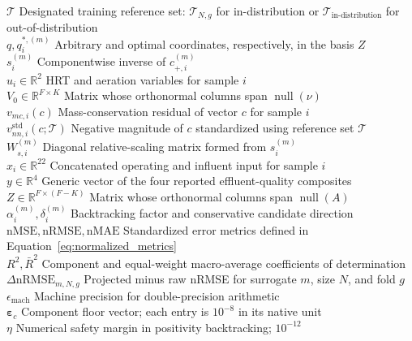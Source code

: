 \documentclass[a4paper,fleqn]{cas-sc}
\newcommand{\csvcomma}{,}
\begin{document}
\begin{tabbing}
$\mathcal{T}$ \> Designated training reference set: $\mathcal{T}_{N\csvcomma{}g}$ for in-distribution or $\mathcal{T}_{\mathrm{in\text{-}distribution}}$ for out-of-distribution \\
$q\csvcomma{}q_i^{*\csvcomma{}(m)}$ \> Arbitrary and optimal coordinates\csvcomma{} respectively\csvcomma{} in the basis $Z$ \\
$s_i^{(m)}$ \> Componentwise inverse of $c_{+\csvcomma{}i}^{(m)}$ \\
$u_i\in\mathbb{R}^{2}$ \> HRT and aeration variables for sample $i$ \\
$V_0\in\mathbb{R}^{F\times K}$ \> Matrix whose orthonormal columns span $\operatorname{null}(\nu)$ \\
$v_{mc\csvcomma{}i}(c)$ \> Mass-conservation residual of vector $c$ for sample $i$ \\
$v_{nn\csvcomma{}i}^{\mathrm{std}}(c;\mathcal{T})$ \> Negative magnitude of $c$ standardized using reference set $\mathcal{T}$ \\
$W_{s\csvcomma{}i}^{(m)}$ \> Diagonal relative-scaling matrix formed from $s_i^{(m)}$ \\
$x_i\in\mathbb{R}^{22}$ \> Concatenated operating and influent input for sample $i$ \\
$y\in\mathbb{R}^{4}$ \> Generic vector of the four reported effluent-quality composites \\
$Z\in\mathbb{R}^{F\times(F-K)}$ \> Matrix whose orthonormal columns span $\operatorname{null}(A)$ \\
$\alpha_i^{(m)}\csvcomma{}\delta_i^{(m)}$ \> Backtracking factor and conservative candidate direction \\
$\mathrm{nMSE}\csvcomma{}\mathrm{nRMSE}\csvcomma{}\mathrm{nMAE}$ \> Standardized error metrics defined in Equation~\eqref{eq:normalized_metrics} \\
$R^2\csvcomma{}\bar R^2$ \> Component and equal-weight macro-average coefficients of determination \\
$\Delta\mathrm{nRMSE}_{m\csvcomma{}N\csvcomma{}g}$ \> Projected minus raw nRMSE for surrogate $m$\csvcomma{} size $N$\csvcomma{} and fold $g$ \\
$\epsilon_{\mathrm{mach}}$ \> Machine precision for double-precision arithmetic \\
$\boldsymbol{\varepsilon}_c$ \> Component floor vector; each entry is $10^{-8}$ in its native unit \\
$\eta$ \> Numerical safety margin in positivity backtracking; $10^{-12}$ \\

\end{tabbing}
\end{document}

